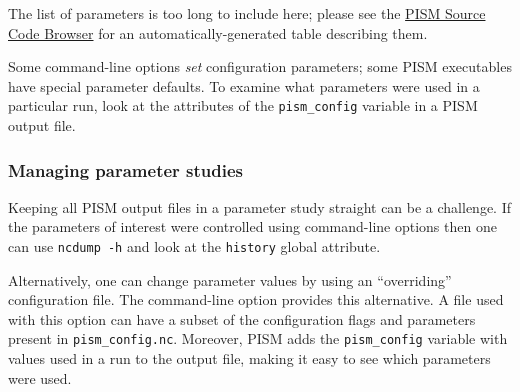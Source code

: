 The list of parameters is too long to include here; please see the \href{http://www.pism-docs.org/doxy/html/index.html}{PISM Source Code Browser} for an automatically-generated table describing them.

Some command-line options \emph{set} configuration parameters; some PISM executables have special parameter defaults. To examine what parameters were used in a particular run, look at the attributes of the \texttt{pism_config} variable in a PISM output file.

\subsubsection*{Managing parameter studies}
\label{sec:parameter-studies}
Keeping all PISM output files in a parameter study straight can be a challenge.  If the parameters of interest were controlled using command-line options then one can use \texttt{ncdump -h} and look at the \texttt{history} global attribute.

Alternatively, one can change parameter values by using an ``overriding'' configuration file.  The  command-line option provides this alternative.  A file used with this option can have a subset of the configuration flags and parameters present in \texttt{pism_config.nc}. Moreover, PISM adds the \texttt{pism_config} variable with values used in a run to the output file, making it easy to see which parameters were used.

